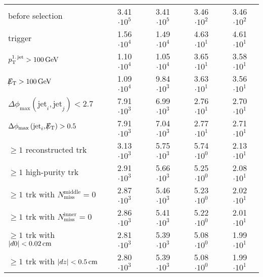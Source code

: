 \begin{table}[!h]
{\begin{tabular}{|l|c|c|c|c|}
before selection                                                                          & 3.41 $\cdot10^{5 }$ & 3.41 $\cdot10^{5 }$ & 3.46 $\cdot10^{2 }$ & 3.46 $\cdot10^{2 }$ \\
trigger                                                                                   & 1.56 $\cdot10^{4 }$ & 1.49 $\cdot10^{4 }$ & 4.63 $\cdot10^{1 }$ & 4.61 $\cdot10^{1 }$ \\
$p_{\text{T}}^{\text{1.\,jet}}>100\,\text{Ge}\kern-0.06667em\text{V}$                                                                     & 1.10 $\cdot10^{4 }$ & 1.05 $\cdot10^{4 }$ & 3.65 $\cdot10^{1 }$ & 3.58 $\cdot10^{1 }$ \\
$\slash\mkern-12mu{E}_{\text{T}}>100\,\text{Ge}\kern-0.06667em\text{V}$                                                                            & 1.09 $\cdot10^{4 }$ & 9.84 $\cdot10^{3 }$ & 3.63 $\cdot10^{1 }$ & 3.56 $\cdot10^{1 }$ \\
$\Delta\phi_{\text{max}} \left( \text{jet}_i, \text{jet}_j  \right)<2.7$                  & 7.91 $\cdot10^{3 }$ & 6.99 $\cdot10^{3 }$ & 2.76 $\cdot10^{1 }$ & 2.70 $\cdot10^{1 }$ \\
$\Delta\phi_{\text{max}} \left( \text{jet}_i, \slash\mkern-12mu{E}_{\text{T}}  \right)>0.5$                          & 7.91 $\cdot10^{3 }$ & 7.04 $\cdot10^{3 }$ & 2.77 $\cdot10^{1 }$ & 2.71 $\cdot10^{1 }$ \\
$\geq1$ reconstructed trk                                                                 & 3.13 $\cdot10^{3 }$ & 5.75 $\cdot10^{3 }$ & 5.74 $\cdot10^{0 }$ & 2.13 $\cdot10^{1 }$ \\
$\geq1$ high-purity trk                                                                   & 2.91 $\cdot10^{3 }$ & 5.66 $\cdot10^{3 }$ & 5.25 $\cdot10^{0 }$ & 2.08 $\cdot10^{1 }$ \\
$\geq1$ trk with $N_{\text{miss}}^{\text{middle}}=0$                                      & 2.87 $\cdot10^{3 }$ & 5.46 $\cdot10^{3 }$ & 5.23 $\cdot10^{0 }$ & 2.02 $\cdot10^{1 }$ \\
$\geq1$ trk with $N_{\text{miss}}^{\text{inner}}=0$                                       & 2.86 $\cdot10^{3 }$ & 5.41 $\cdot10^{3 }$ & 5.22 $\cdot10^{0 }$ & 2.01 $\cdot10^{1 }$ \\
$\geq1$ trk with $|d0|<0.02\,\text{cm}$                                                           & 2.81 $\cdot10^{3 }$ & 5.39 $\cdot10^{3 }$ & 5.08 $\cdot10^{0 }$ & 1.99 $\cdot10^{1 }$ \\
$\geq1$ trk with $|dz|<0.5\,\text{cm}$                                                            & 2.80 $\cdot10^{3 }$ & 5.39 $\cdot10^{3 }$ & 5.08 $\cdot10^{0 }$ & 1.99 $\cdot10^{1 }$ \\

\end{tabular}}
\end{table}

